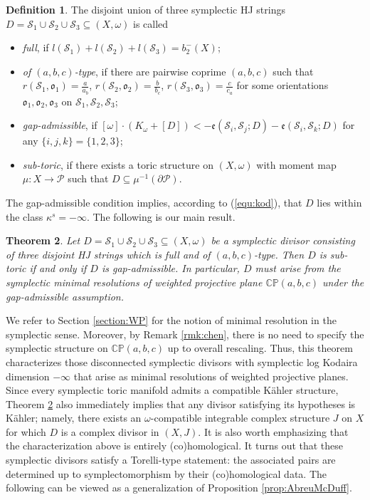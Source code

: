 \documentclass[11pt]{article}
\newtheorem{theorem}{Theorem}[section]
\theoremstyle{definition}
\newtheorem{definition}[theorem]{Definition}
\theoremstyle{remark}
\newcommand{\CP}{\mathbb{CP}}
\newcommand{\st}{\mathcal{S}}
\newcommand{\e}{\mathfrak{e}}
\newcommand{\sto}{\mathfrak{o}}
\begin{document}
\begin{definition}\label{def:3assumptions}
The disjoint union of three symplectic HJ strings $D=\st_1\cup\st_2\cup\st_3\subseteq (X,\omega)$ is called
   \begin{itemize}[nosep]
  \item \emph{full}, if $l(\st_1)+l(\st_2)+l(\st_3)=b_2^-(X)$;
  \item \emph{of $(a,b,c)$-type}, if there are pairwise coprime $(a,b,c)$ such that $r(\st_1,\sto_1)=\frac{a}{a_b}$, $r(\st_2,\sto_2)=\frac{b}{b_c}$, $r(\st_3,\sto_3)=\frac{c}{c_a}$ for some orientations $\sto_1,\sto_2,\sto_3$ on $\st_1,\st_2,\st_3$;
    \item \emph{gap-admissible}, if $[\omega]\cdot (K_\omega+[D])<-\e(\st_i,\st_j;D)-\e(\st_i,\st_k;D)$ for any $\{i,j,k\}=\{1,2,3\}$; 
    \item \emph{sub-toric}, if there exists a toric structure on $(X,\omega)$ with moment map $\mu\colon X\to \mathcal{P}$ such that $D\subseteq \mu^{-1}(\partial\mathcal{P})$.
  \end{itemize}
\end{definition}

The gap-admissible condition implies, according to (\ref{equ:kod}), that $D$ lies within the class $\kappa^s=-\infty$. The following is our main result.

\begin{theorem}\label{thm:main}
  Let $D=\st_1\cup\st_2\cup\st_3\subseteq (X,\omega)$ be a symplectic divisor consisting of three disjoint HJ strings which is full and of $(a,b,c)$-type. Then $D$ is sub-toric if and only if $D$ is gap-admissible. In particular, $D$ must arise from the symplectic minimal resolutions of weighted projective plane $\CP(a,b,c)$ under the gap-admissible assumption.
\end{theorem}
We refer to Section \ref{section:WP} for the notion of minimal resolution in the symplectic sense. Moreover, by Remark \ref{rmk:chen}, there is no need to specify the symplectic structure on $\CP(a,b,c)$ up to overall rescaling. Thus, this theorem characterizes those disconnected symplectic divisors with symplectic log Kodaira dimension $-\infty$ that arise as minimal resolutions of weighted projective planes.
Since every symplectic toric manifold admits a compatible K\"ahler structure, Theorem \ref{thm:main} also immediately implies that any divisor satisfying its hypotheses is K\"ahler; namely, there exists an $\omega$-compatible integrable complex structure $J$ on $X$ for which $D$ is a complex divisor in $(X,J)$. It is also worth emphasizing that the characterization above is entirely (co)homological.
It turns out that these symplectic divisors satisfy a Torelli-type statement: the associated pairs are determined up to symplectomorphism by their (co)homological data. The following can be viewed as a generalization of Proposition \ref{prop:AbreuMcDuff}.
\end{document}
